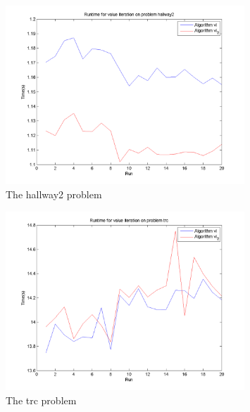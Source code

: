 \documentclass[10pt,a4paper]{article}
\begin{document}
\begin{figure}
\vspace{-20pt}
\hspace{-30pt}
\centering
\includegraphics[width=0.8\textwidth]{Timings/hallway2/timings_vi.png}
\caption{The hallway2 problem}
\hspace{-30pt}
\label{fig:vi_hallway2}
\vspace{-20pt}
\end{figure}
        
\begin{figure}
\vspace{-20pt}
\hspace{-30pt}
\centering
\includegraphics[width=0.8\textwidth]{Timings/trc/timings_vi.png}
\hspace{-30pt}
\caption{The trc problem}
\label{fig:vi_trc}
\vspace{-20pt}
\end{figure}

\end{document}
